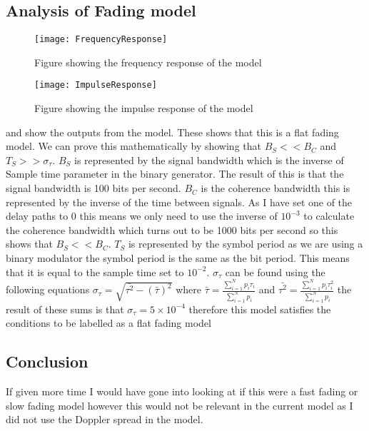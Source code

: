 {	\subsection{Analysis of Fading model}{
		\begin{figure}
			\centering
			\texttt{[image: FrequencyResponse]}
			\caption{Figure showing the frequency response of the model}
			\label{fig:FreqResponse}
		\end{figure}
		\begin{figure}
			\centering
			\texttt{[image: ImpulseResponse]}
			\caption{Figure showing the impulse response of the model}
			\label{fig:ImplResponse}
		\end{figure}
		 and  show the outputs from the model. These shows that this is a flat fading model. We can prove this mathematically by showing that $B_S << B_C$ and $T_S >> \sigma_\tau$. $B_S$ is represented by the signal bandwidth which is the inverse of Sample time parameter in the binary generator. The result of this is that the signal bandwidth is 100 bits per second. $B_C$ is the coherence bandwidth this is represented by the inverse of the time between signals. As I have set one of the delay paths to 0 this means we only need to use the inverse of $10^{-3}$ to calculate the coherence bandwidth which turns out to be 1000 bits per second so this shows that $B_S << B_C$. 
		$T_S$ is represented by the symbol period as we are using a binary modulator the symbol period is the same as the bit period. This means that it is equal to the sample time set to $10^{-2}$. $\sigma_\tau$ can be found using the following equations $\sigma_\tau = \sqrt{\bar{\tau^2}-(\bar{\tau})^2}$ where $\bar{\tau} = \frac{\sum_{i=1}^{N}p_i\tau_i}{\sum_{i=1}^{N}p_i}$ and $\bar{\tau^2} = \frac{\sum_{i=1}^{N}p_i\tau^2_i}{\sum_{i=1}^{N}p_i}$ the result of these sums is that $\sigma_\tau = 5\times10^{-4}$ therefore this model satisfies the conditions to be labelled as a flat fading model
	}
	\subsection{Conclusion}
	{
		If given more time I would have gone into looking at if this were a fast fading or slow fading model however this would not be relevant in the current model as I did not use the Doppler spread in the model.
	}
}